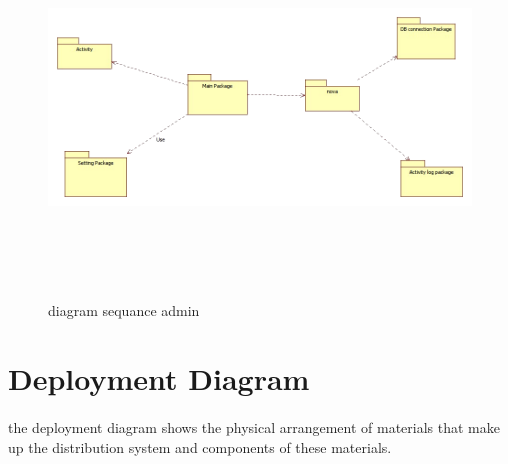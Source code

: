 \begin{figure}[!h]
 \center
 \includegraphics[width=12cm, height=10cm]{./images/design/package}
 \caption{diagram sequance admin}
\end{figure}
\newpage
\section{Deployment Diagram}
\paragraph{}the deployment diagram shows the physical arrangement of materials that make up the distribution system and components of these materials.\par
